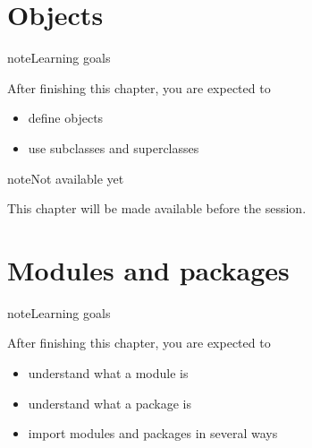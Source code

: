 \documentclass[letterpaper,10pt,english]{jupyterBook}
\begin{document}
\sphinxstepscope


\chapter{Objects}
\label{\detokenize{placeholder_notebooks/3_Objects/3_Objects_student:objects}}\label{\detokenize{placeholder_notebooks/3_Objects/3_Objects_student::doc}}
\begin{sphinxadmonition}{note}{Learning goals}

\sphinxAtStartPar
After finishing this chapter, you are expected to
\begin{itemize}
\item {} 
\sphinxAtStartPar
define objects

\item {} 
\sphinxAtStartPar
use subclasses and superclasses

\end{itemize}
\end{sphinxadmonition}

\begin{sphinxadmonition}{note}{Not available yet}

\sphinxAtStartPar
This chapter will be made available before the session.
\end{sphinxadmonition}

\sphinxstepscope


\chapter{Modules and packages}
\label{\detokenize{placeholder_notebooks/4_ModulesPackages/4_ModulesPackages_student:modules-and-packages}}\label{\detokenize{placeholder_notebooks/4_ModulesPackages/4_ModulesPackages_student::doc}}
\begin{sphinxadmonition}{note}{Learning goals}

\sphinxAtStartPar
After finishing this chapter, you are expected to
\begin{itemize}
\item {} 
\sphinxAtStartPar
understand what a module is

\item {} 
\sphinxAtStartPar
understand what a package is

\item {} 
\sphinxAtStartPar
import modules and packages in several ways

\end{itemize}
\end{sphinxadmonition}
\end{document}
